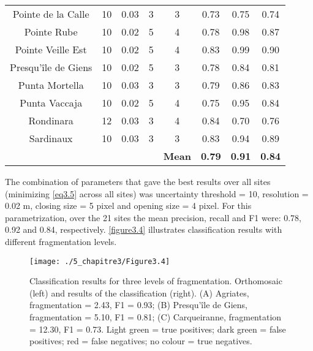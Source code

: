 \begin{table}[H]
\begin{tabular}{*{1}{c}|*{4}{c}|*{3}{c}}
        Pointe de la Calle & 10 & 0.03 & 3 & 3 & 0.73 & 0.75 & 0.74 \\
        Pointe Rube & 10 & 0.02 & 5 & 4 & 0.78 & 0.98 & 0.87 \\
        Pointe Veille Est & 10 & 0.02 & 5 & 4 & 0.83 & 0.99 & 0.90 \\
        Presqu’île de Giens & 10 & 0.02 & 5 & 3 & 0.78 & 0.84 & 0.81 \\
        Punta Mortella & 10 & 0.03 & 3 & 3 & 0.79 & 0.86 & 0.83 \\
        Punta Vaccaja & 10 & 0.02 & 5 & 4 & 0.75 & 0.95 & 0.84 \\
        Rondinara & 12 & 0.03 & 3 & 4 & 0.84 & 0.70 & 0.76 \\
        Sardinaux & 10 & 0.03 & 3 & 3 & 0.83 & 0.94 & 0.89 \\
        \midrule
         &  &  &  & \textbf{Mean} & \textbf{0.79} & \textbf{0.91} & \textbf{0.84} \\ \bottomrule
    \end{tabular}
\end{table}

The combination of parameters that gave the best results over all sites (minimizing \autoref{eq3.5} across all sites) was uncertainty threshold = 10, resolution = 0.02 m, closing size = 5 pixel and opening size = 4 pixel. For this parametrization, over the 21 sites the mean precision, recall and F1 were: 0.78, 0.92 and 0.84, respectively. \autoref{figure3.4} illustrates classification results with different fragmentation levels.

\begin{figure}[htbp]
	\begin{center}
	\texttt{[image: ./5\_chapitre3/Figure3.4]}
		\caption[Classification results for three levels of fragmentation.]{Classification results for three levels of fragmentation. Orthomosaic (left) and results of the classification (right). (A) Agriates, fragmentation = 2.43, F1 = 0.93; (B) Presqu’île de Giens, fragmentation = 5.10, F1 = 0.81; (C) Carqueiranne, fragmentation = 12.30, F1 = 0.73. Light green = true positives; dark green = false positives; red = false negatives; no colour = true negatives.}
	\label{figure3.4}
\end{center}
\end{figure}

